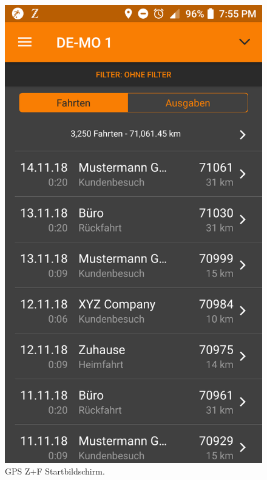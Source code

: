 \documentclass[a4paper]{article}
\begin{document}
\begin{figure}[H]%
    \begin{minipage}[b]{.4\linewidth} %
        \includegraphics[scale=0.14]{img/pro1}
        \caption{\label{img:img/pro1}GPS Z+F Startbildschirm.}
    \end{minipage}
    \hspace{0.1\linewidth}%
    \begin{minipage}[b]{.4\linewidth} %

\end{minipage}
\end{figure}
\end{document}
